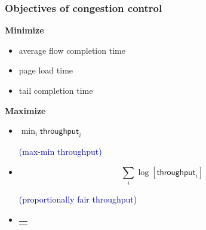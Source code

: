 \documentclass[svgnames]{beamer}
\begin{document}
\begin{frame}
\frametitle{Objectives of congestion control}

\textbf{Minimize}

\begin{itemize}
\item average flow completion time

\item page load time

\item tail completion time

\end{itemize}

\textbf{Maximize}

\begin{itemize}

\item \begin{minipage}{3.75 cm}
$\min_i \textsf{throughput}_i$
\end{minipage} \textsf{\textcolor{DarkBlue}{(max-min throughput)}}

\item \begin{minipage}{3.75 cm}
\[\sum_i \log \left[ \textsf{throughput}_i \right]\]
\end{minipage} \textsf{\textcolor{DarkBlue}{(proportionally fair throughput)}}

\item
\begin{minipage}{3.75 cm}
\begin{tabular}{l}
\cellcolor{Bisque}\raisebox{0.75 cm}{\begin{minipage}{3.75 cm}
\[\sum_i \log \left[ \frac{\textsf{throughput}_i}{\visible<2>{
\textcolor{DarkBlue}{\big(}
}\textsf{delay}_i\visible<2>{
\textcolor{DarkBlue}{\big)^{\bm \delta}}}} \right]\]
\end{minipage} \textsf{\textcolor{DarkBlue}{(proportionally fair throughput/delay)}}}
\end{tabular}
\end{minipage}

\end{itemize}

\end{frame}
\end{document}
